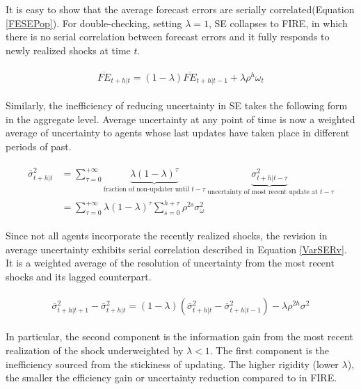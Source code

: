 \documentclass[12pt]{article}
\begin{document}
	It is easy to show that the average forecast errors are serially correlated(Equation \ref{FESEPop}). For double-checking, setting $\lambda=1$, SE collapses to FIRE, in which there is no serial correlation between forecast errors and it fully responds to newly realized shocks at time $t$.  
	
	\begin{eqnarray}\label{FESEPop}
		\begin{aligned}
			\overline{FE}_{t+h|t}  = (1-\lambda) \overline {FE}_{t+h|t-1} + \lambda \rho^h \omega_t 
		\end{aligned}
	\end{eqnarray}
	
	Similarly, the inefficiency of reducing uncertainty in SE takes the following form in the aggregate level. Average uncertainty at any point of time is now a weighted average of uncertainty to agents whose last updates have taken place in different periods of past. 
	
	
	\begin{eqnarray}\label{VarSEPop}
		\begin{aligned}
			\bar \sigma^2_{t+h|t} & = \sum^{+\infty}_{\tau =0} \underbrace{\lambda (1-\lambda)^\tau}_{\text{fraction of non-updater until }t-\tau} \underbrace{\sigma^2_{t+h|t-\tau}}_{\text{ uncertainty of most recent update at }t-\tau} \\
			& = \sum^{+\infty}_{\tau =0} \lambda (1-\lambda)^\tau \sum^{h+\tau}_{s=0}\rho^{2s} \sigma^2_{\omega}
		\end{aligned}
	\end{eqnarray}
	
	
	Since not all agents incorporate the recently realized shocks, the revision in average uncertainty exhibits serial correlation described in Equation \ref{VarSERv}. It is a weighted average of the resolution of uncertainty from the most recent shocks and its lagged counterpart. 
	
	\begin{eqnarray}\label{VarSERv}
		\begin{aligned}
			\bar \sigma^2_{t+h|t+1} - \bar \sigma^2_{t+h|t} = (1-\lambda)(
			\bar \sigma^2_{t+h|t} - \bar \sigma^2_{t+h|t-1}) -\lambda \rho^{2h} \sigma^2 
		\end{aligned}
	\end{eqnarray}
	
	In particular, the second component is the information gain from the most recent realization of the shock underweighted by $\lambda<1$. The first component is the inefficiency sourced from the stickiness of updating. The higher rigidity (lower $\lambda$), the smaller the efficiency gain or uncertainty reduction compared to in FIRE. 
	
\end{document}

